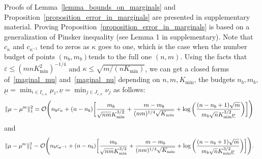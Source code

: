 Proofs of Lemma~\ref{lemma_bounds_on_marginals} and Proposition~\ref{proposition_error_in_marginals} are presented in supplementary material. 
Proving Proposition~\ref{proposition_error_in_marginals} is based on a generalization of Pinsker inequality (see Lemma 1 in supplementary). 
Note that $c_\kappa$ and $c_{\kappa^{-1}}$ tend to zeros as $\kappa$ goes to one, which is the case when the number budget of points $(n_b,m_b) $tends to the full one $(n,m)$.
Using the facts that $\varepsilon \leq (mnK_{\min}^2)^{-1/4}$ and $\kappa \leq \sqrt{m/(nK_{\min})}$, we can get a closed forms of~\eqref{maginal_mu} and~\eqref{maginal_nu} depending on $n,m,K_{\min}$, the budgets $n_b,m_b,$ $\underline{\mu} = \min_{i\in I_{\varepsilon,\kappa}}\mu_i, \underline{\nu} = \min_{j\in J_{\varepsilon,\kappa}}\nu_j$ as follows:
\begin{align*}
{\|{\mu} -{\mu}^{\text{sc}}\|^2_1} = \mathcal{O}\Bigg(n_bc_\kappa + (n- n_b) \bigg[\frac{m_b}{\sqrt{nm}K_{\min}^{3/2}} &+ \frac{m-m_b}{(nm)^{1/4}\sqrt{K_{\min}}}
 + \log\bigg(\frac{(n-n_b+1)\sqrt{m}}{m_b \sqrt{n}K_{\min}^{3/2}\underline{\nu}} 
\bigg)\bigg]\Bigg)
\end{align*}
and 
\begin{align*}
{\|{\mu} -{\mu}^{\text{sc}}\|^2_1} = \mathcal{O}\Bigg(n_bc_{\kappa^{-1}} + (n- n_b) \bigg[\frac{m_b}{\sqrt{nm}K_{\min}^{3/2}} &+ \frac{m-m_b}{(nm)^{1/4}\sqrt{K_{\min}}}
 + \log\bigg(\frac{(n-n_b+1)\sqrt{m}}{m_b \sqrt{n}K_{\min}^{3/2}\underline{\nu}} 
\bigg)\bigg]\Bigg).
\end{align*}

